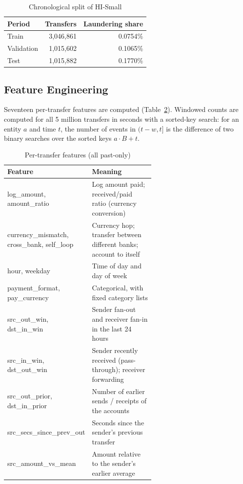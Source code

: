 \begin{table}[H]
\centering
\renewcommand{\arraystretch}{1.25}
\begin{tabular}{|l|r|r|}
\hline
\textbf{Period} & \textbf{Transfers} & \textbf{Laundering share} \\ \hline
Train & 3,046,861 & 0.0754\% \\ \hline
Validation & 1,015,602 & 0.1065\% \\ \hline
Test & 1,015,882 & 0.1770\% \\ \hline
\end{tabular}
\caption{Chronological split of HI-Small}
\label{tab:split}
\end{table}

\subsection{Feature Engineering}
Seventeen per-transfer features are computed (Table~\ref{tab:features}). Windowed counts are computed for all 5 million transfers in seconds with a sorted-key search: for an entity $a$ and time $t$, the number of events in $(t-w, t]$ is the difference of two binary searches over the sorted keys $a \cdot B + t$.

\begin{table}[H]
\centering
\renewcommand{\arraystretch}{1.2}
\begin{tabular}{|l|>{\raggedright\arraybackslash}p{0.6\linewidth}|} \hline
\textbf{Feature} & \textbf{Meaning} \\ \hline
log\_amount, amount\_ratio & Log amount paid; received/paid ratio (currency conversion) \\ \hline
currency\_mismatch, cross\_bank, self\_loop & Currency hop; transfer between different banks; account to itself \\ \hline
hour, weekday & Time of day and day of week \\ \hline
payment\_format, pay\_currency & Categorical, with fixed category lists \\ \hline
src\_out\_win, dst\_in\_win & Sender fan-out and receiver fan-in in the last 24 hours \\ \hline
src\_in\_win, dst\_out\_win & Sender recently received (pass-through); receiver forwarding \\ \hline
src\_out\_prior, dst\_in\_prior & Number of earlier sends / receipts of the accounts \\ \hline
src\_secs\_since\_prev\_out & Seconds since the sender's previous transfer \\ \hline
src\_amount\_vs\_mean & Amount relative to the sender's earlier average \\ \hline
\end{tabular}
\caption{Per-transfer features (all past-only)}
\label{tab:features}
\end{table}

